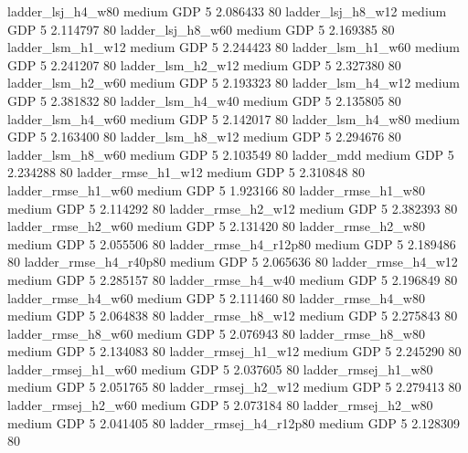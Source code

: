      ladder_lsj_h4_w80     medium      GDP                 5 2.086433 80
     ladder_lsj_h8_w12     medium      GDP                 5 2.114797 80
     ladder_lsj_h8_w60     medium      GDP                 5 2.169385 80
     ladder_lsm_h1_w12     medium      GDP                 5 2.244423 80
     ladder_lsm_h1_w60     medium      GDP                 5 2.241207 80
     ladder_lsm_h2_w12     medium      GDP                 5 2.327380 80
     ladder_lsm_h2_w60     medium      GDP                 5 2.193323 80
     ladder_lsm_h4_w12     medium      GDP                 5 2.381832 80
     ladder_lsm_h4_w40     medium      GDP                 5 2.135805 80
     ladder_lsm_h4_w60     medium      GDP                 5 2.142017 80
     ladder_lsm_h4_w80     medium      GDP                 5 2.163400 80
     ladder_lsm_h8_w12     medium      GDP                 5 2.294676 80
     ladder_lsm_h8_w60     medium      GDP                 5 2.103549 80
            ladder_mdd     medium      GDP                 5 2.234288 80
    ladder_rmse_h1_w12     medium      GDP                 5 2.310848 80
    ladder_rmse_h1_w60     medium      GDP                 5 1.923166 80
    ladder_rmse_h1_w80     medium      GDP                 5 2.114292 80
    ladder_rmse_h2_w12     medium      GDP                 5 2.382393 80
    ladder_rmse_h2_w60     medium      GDP                 5 2.131420 80
    ladder_rmse_h2_w80     medium      GDP                 5 2.055506 80
 ladder_rmse_h4_r12p80     medium      GDP                 5 2.189486 80
 ladder_rmse_h4_r40p80     medium      GDP                 5 2.065636 80
    ladder_rmse_h4_w12     medium      GDP                 5 2.285157 80
    ladder_rmse_h4_w40     medium      GDP                 5 2.196849 80
    ladder_rmse_h4_w60     medium      GDP                 5 2.111460 80
    ladder_rmse_h4_w80     medium      GDP                 5 2.064838 80
    ladder_rmse_h8_w12     medium      GDP                 5 2.275843 80
    ladder_rmse_h8_w60     medium      GDP                 5 2.076943 80
    ladder_rmse_h8_w80     medium      GDP                 5 2.134083 80
   ladder_rmsej_h1_w12     medium      GDP                 5 2.245290 80
   ladder_rmsej_h1_w60     medium      GDP                 5 2.037605 80
   ladder_rmsej_h1_w80     medium      GDP                 5 2.051765 80
   ladder_rmsej_h2_w12     medium      GDP                 5 2.279413 80
   ladder_rmsej_h2_w60     medium      GDP                 5 2.073184 80
   ladder_rmsej_h2_w80     medium      GDP                 5 2.041405 80
ladder_rmsej_h4_r12p80     medium      GDP                 5 2.128309 80
